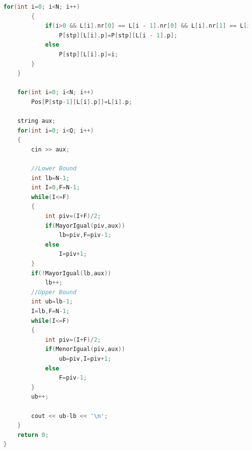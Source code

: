 \documentclass{report}
\begin{document}
\begin{lstlisting}[language=C++]
        for(int i=0; i<N; i++)
        {
            if(i>0 && L[i].nr[0] == L[i - 1].nr[0] && L[i].nr[1] == L[i - 1].nr[1] )
                P[stp][L[i].p]=P[stp][L[i - 1].p];
            else
                P[stp][L[i].p]=i;
        }
    }

    for(int i=0; i<N; i++)
        Pos[P[stp-1][L[i].p]]=L[i].p;

    string aux;
    for(int i=0; i<Q; i++)
    {
        cin >> aux;

        //Lower Bound
        int lb=N-1;
        int I=0,F=N-1;
        while(I<=F)
        {
            int piv=(I+F)/2;
            if(MayorIgual(piv,aux))
                lb=piv,F=piv-1;
            else
                I=piv+1;
        }
        if(!MayorIgual(lb,aux))
            lb++;
        //Upper Bound
        int ub=lb-1;
        I=lb,F=N-1;
        while(I<=F)
        {
            int piv=(I+F)/2;
            if(MenorIgual(piv,aux))
                ub=piv,I=piv+1;
            else
                F=piv-1;
        }
        ub++;

        cout << ub-lb << '\n';
    }
    return 0;
}
\end{lstlisting}
\end{document}
